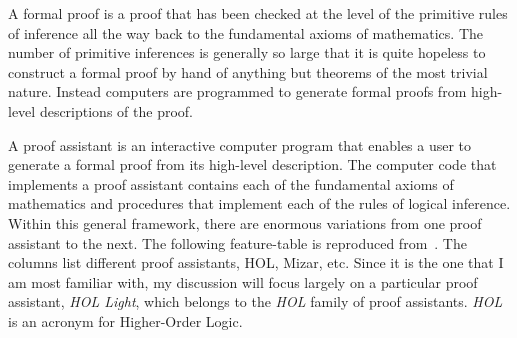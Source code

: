\documentclass{llncs}
\begin{document}
A formal proof is a proof that has been checked at the level of the
primitive rules of inference all the way back to the fundamental
axioms of mathematics.  The number of primitive inferences is
generally so large that it is quite hopeless to construct a formal
proof by hand of anything but theorems of the most trivial nature.
Instead computers are programmed to generate formal proofs from
high-level descriptions of the proof.

A proof assistant is an interactive computer program that enables a user to
generate a formal proof from its high-level description.  The computer code
that implements a proof assistant contains each of the fundamental axioms
of mathematics and procedures that implement each of the rules of logical
inference.  Within this general framework, there are enormous variations
from one proof assistant to the next. The following feature-table is
reproduced from~\cite{wiedijk:17}.  The columns list different proof
assistants, HOL, Mizar, etc.  Since it is the one that I am most familiar with,
my discussion will focus largely on a particular
proof assistant, {\it HOL Light}, which belongs to the {\it HOL} family of
proof assistants. {\it HOL} is an acronym for Higher-Order Logic.
\end{document}
